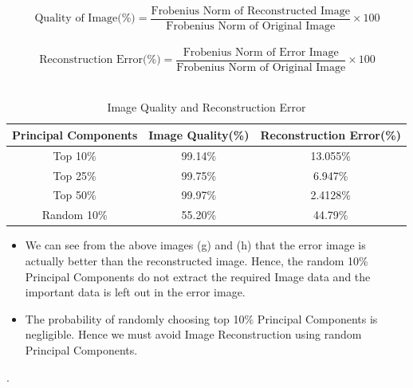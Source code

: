 \documentclass[a4 paper]{article}
\begin{document}
\begin{equation}
    \text{Quality of Image(\%)} = \dfrac{\text{Frobenius Norm of Reconstructed Image}}{\text{Frobenius Norm of Original Image}}\times 100
\end{equation}\\
\begin{equation}
    \text{Reconstruction Error(\%)} = \dfrac{\text{Frobenius Norm of Error Image}}{\text{Frobenius Norm of Original Image}}\times 100
\end{equation}\\
\begin{table}[h!]
\centering
\begin{tabular}{|c|c|c|} 
\hline
Principal Components & Image Quality(\%) & Reconstruction Error(\%)\\ [0.5ex] 
\hline
Top 10\% & 99.14\%  & 13.055\% \\
Top 25\% & 99.75\% & 6.947\% \\
Top 50\% & 99.97\% & 2.4128\% \\
Random 10\%&55.20\%& 44.79\%\\
\hline
\end{tabular}
\caption{Image Quality and Reconstruction Error}
\end{table}
\begin{itemize}
  \item We can see from the above images (g) and (h) that the error image is actually better than the reconstructed image. Hence, the random 10\% Principal Components do not extract the required Image data and the important data is left out in the  error image.
  \item The probability of randomly choosing top 10\% Principal Components is negligible. Hence we must avoid Image Reconstruction using random Principal Components. 
\end{itemize}
. 
\end{document}
